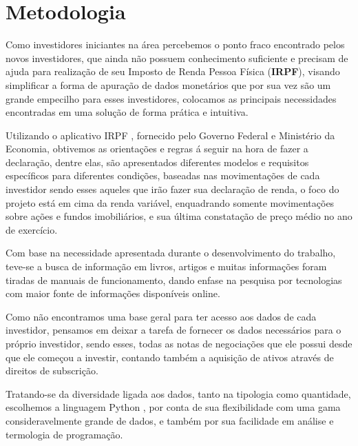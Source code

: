 
\section{Metodologia}

Como investidores iniciantes na área percebemos o ponto fraco encontrado pelos novos investidores, que ainda não possuem conhecimento suficiente e precisam de ajuda para realização de seu Imposto de Renda Pessoa Física (\textbf{IRPF}), visando simplificar a forma de apuração de dados monetários que por sua vez são um grande empecilho para esses investidores, colocamos as principais necessidades encontradas em uma solução de forma prática e intuitiva.

Utilizando o aplicativo IRPF \cite{IRPF2022}, fornecido pelo Governo Federal e Ministério da Economia, obtivemos as orientações e regras á seguir na hora de fazer a declaração, dentre elas, são apresentados diferentes modelos e requisitos específicos para diferentes condições, baseadas nas movimentações de cada investidor sendo esses aqueles que irão fazer sua declaração de renda, o foco do projeto está em cima da renda variável, enquadrando somente movimentações sobre ações e fundos imobiliários, e sua última constatação de preço médio no ano de exercício.
 
 Com base na necessidade apresentada durante o desenvolvimento do trabalho, teve-se a busca de informação em livros, artigos e muitas informações foram tiradas de manuais de funcionamento, dando enfase na pesquisa por tecnologias com maior fonte de informações disponíveis online.

 Como não encontramos uma base geral para ter acesso aos dados de cada investidor, pensamos em deixar a tarefa de fornecer os dados necessários para o próprio investidor, sendo esses, todas as notas de negociações que ele possui desde que ele começou a investir, contando também a aquisição de ativos através de direitos de subscrição.

Tratando-se da diversidade ligada aos dados, tanto na tipologia como quantidade, escolhemos a linguagem Python \cite{mckinney2019}, por conta de sua flexibilidade com uma gama consideravelmente grande de dados, e também por sua facilidade em análise e termologia de programação.
